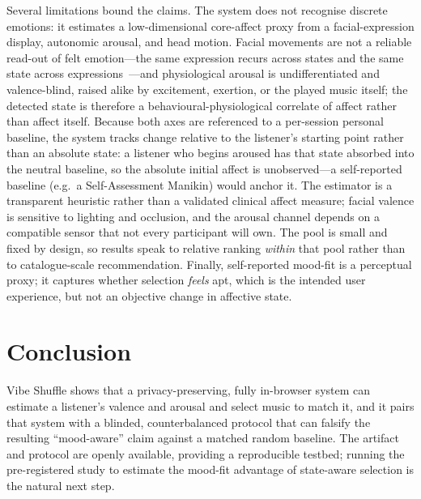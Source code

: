 Several limitations bound the claims. The system does not recognise discrete
emotions: it estimates a low-dimensional core-affect proxy from a
facial-expression display, autonomic arousal, and head motion. Facial movements
are not a reliable read-out of felt emotion---the same expression recurs across
states and the same state across expressions~\cite{barrett2019}---and
physiological arousal is undifferentiated and valence-blind, raised alike by
excitement, exertion, or the played music itself; the detected state is therefore
a behavioural-physiological correlate of affect rather than affect itself.
Because both axes are referenced to a per-session personal baseline, the system
tracks change relative to the listener's starting point rather than an absolute
state: a listener who begins aroused has that state absorbed into the neutral
baseline, so the absolute initial affect is unobserved---a self-reported baseline
(e.g.\ a Self-Assessment Manikin) would anchor it. The estimator is a transparent
heuristic rather than a validated clinical affect measure; facial valence is
sensitive to lighting and occlusion, and the arousal channel depends on a
compatible sensor that not every participant will own. The pool is small and fixed by design, so
results speak to relative ranking \emph{within} that pool rather than to
catalogue-scale recommendation. Finally, self-reported mood-fit is a perceptual
proxy; it captures whether selection \emph{feels} apt, which is the intended user
experience, but not an objective change in affective state.

\section{Conclusion}

Vibe Shuffle shows that a privacy-preserving, fully in-browser system can estimate
a listener's valence and arousal and select music to match it, and it pairs that
system with a blinded, counterbalanced protocol that can falsify the resulting
``mood-aware'' claim against a matched random baseline. The artifact and protocol
are openly available, providing a reproducible testbed; running the pre-registered
study to estimate the mood-fit advantage of state-aware selection is the natural
next step.
